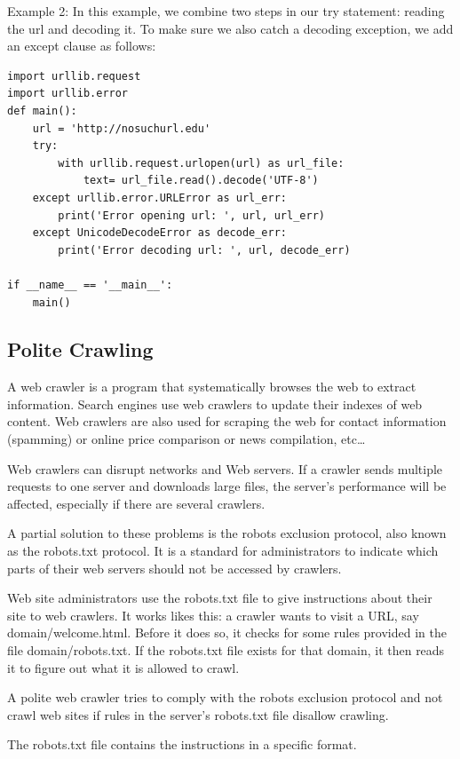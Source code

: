 \documentclass{article}
\begin{document}
Example 2:
In this example, we combine two steps in our try statement:  reading the url and decoding it.  To make sure we also catch a decoding exception, we add an except clause as follows:

\begin{lstlisting}
import urllib.request
import urllib.error
def main():
    url = 'http://nosuchurl.edu'
    try:
        with urllib.request.urlopen(url) as url_file:
            text= url_file.read().decode('UTF-8')
    except urllib.error.URLError as url_err:
        print('Error opening url: ', url, url_err)
    except UnicodeDecodeError as decode_err:
        print('Error decoding url: ', url, decode_err)  
        
if __name__ == '__main__':
    main()    
\end{lstlisting}

\subsection{Polite Crawling}
A web crawler is a program that systematically browses the web to extract information.  Search engines use web crawlers to update their indexes of web content.  Web crawlers are also used for scraping the web for contact information (spamming) or online price comparison or news compilation, etc…

Web crawlers  can disrupt networks and Web servers.  If a crawler sends multiple requests to one server and downloads large files, the server’s performance will be affected, especially if there are several crawlers. 

A partial solution to these problems is the robots exclusion protocol, also known as the robots.txt protocol.  It is a standard for administrators to indicate which parts of their web servers should not be accessed by crawlers.

Web site administrators use the robots.txt file to give instructions about their site to web crawlers.  It works likes this: a crawler wants to visit a URL, say domain/welcome.html.  Before it does so, it checks for some rules provided in the file domain/robots.txt.  If the robots.txt file exists for that domain, it then reads it to figure out what it is allowed to crawl.

A polite web crawler tries to comply with the robots exclusion protocol and not crawl web sites if rules in the server's robots.txt file disallow crawling.

The robots.txt file contains the instructions in a specific format.  
\end{document}

